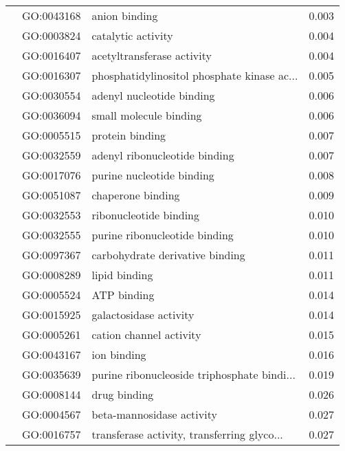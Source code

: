 \begin{longtable}{lllr}
   & GO:0043168 &                                anion binding &         0.003 \\
   & GO:0003824 &                           catalytic activity &         0.004 \\
   & GO:0016407 &                   acetyltransferase activity &         0.004 \\
   & GO:0016307 &  phosphatidylinositol phosphate kinase ac... &         0.005 \\
   & GO:0030554 &                    adenyl nucleotide binding &         0.006 \\
   & GO:0036094 &                       small molecule binding &         0.006 \\
   & GO:0005515 &                              protein binding &         0.007 \\
   & GO:0032559 &                adenyl ribonucleotide binding &         0.007 \\
   & GO:0017076 &                    purine nucleotide binding &         0.008 \\
   & GO:0051087 &                            chaperone binding &         0.009 \\
   & GO:0032553 &                       ribonucleotide binding &         0.010 \\
   & GO:0032555 &                purine ribonucleotide binding &         0.010 \\
   & GO:0097367 &              carbohydrate derivative binding &         0.011 \\
   & GO:0008289 &                                lipid binding &         0.011 \\
   & GO:0005524 &                                  ATP binding &         0.014 \\
   & GO:0015925 &                       galactosidase activity &         0.014 \\
   & GO:0005261 &                      cation channel activity &         0.015 \\
   & GO:0043167 &                                  ion binding &         0.016 \\
   & GO:0035639 &  purine ribonucleoside triphosphate bindi... &         0.019 \\
   & GO:0008144 &                                 drug binding &         0.026 \\
   & GO:0004567 &                    beta-mannosidase activity &         0.027 \\
   & GO:0016757 &  transferase activity, transferring glyco... &         0.027 \\

\end{longtable}
